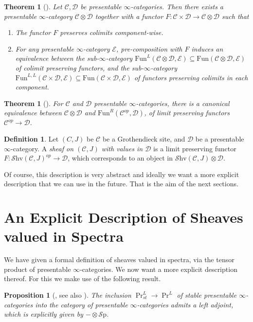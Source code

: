\documentclass[10pt]{amsart}
\newcommand{\C}{\mathscr{C}}
\newcommand{\D}{\mathscr{D}}
\newcommand{\E}{\mathscr{E}}
\newcommand{\Sp}{\mathscr{S}\mathrm{p}}
\newcommand{\Fun}{\mathrm{Fun}}
\newcommand{\Shv}{\mathscr{S}\mathrm{hv}}
\newtheorem{theorem}[equation]{Theorem}
\newtheorem{proposition}[equation]{Proposition}
\theoremstyle{definition}
\newtheorem{definition}[equation]{Definition}
\theoremstyle{remark}
\numberwithin{equation}{section}
\begin{document}
\begin{theorem}[{\cite[Proposition 4.8.1.15]{lurie2017ha}}]
  Let $\C, \D$ be presentable $\infty$-categories. Then there exists a presentable $\infty$-category $\C \otimes \D$ together with a functor $F:\C\times\D\rightarrow\C\otimes\D$ such that 
  \begin{enumerate}
	\item The functor $F$ preserves colimits component-wise.
	\item For any presentable $\infty$-category $\E$, pre-composition with $F$ induces an equivalence between the sub-$\infty$-category $\Fun^L(\C \otimes \D , \E)\subseteq\Fun(\C \otimes \D , \E)$ of colimit preserving functors, and the sub-$\infty$-category $\Fun^{L,L}(\C \times \D, \E)\subseteq\Fun(\C\times\D,\E)$ of functors preserving colimits in each component. 
  \end{enumerate}
\end{theorem}
\begin{theorem}[{\cite[Proposition 4.8.1.17]{lurie2017ha}}]For $\C$ and $\D$ presentable $\infty$-categories, there is a canonical equivalence between $\C\otimes\D$ and $\Fun^R(\C^{op},\D)$, of limit preserving functors $\C^{op}\to\D$. 
\end{theorem}
\begin{definition}
  Let $(C,J)$ be $\C$ be a Grothendieck site, and $\D$ be a presentable $\infty$-category. A \emph{sheaf on $(\C,J)$ with values in $\D$} is a limit preserving functor $F\colon \Shv(\C,J)^{op} \to \D$, which corresponds to an object in $\Shv(\C,J) \otimes \D$. 
\end{definition}

Of course, this description is very abstract and ideally we want a more explicit description that we can use in the future. That is the aim of the next sections.

\section{An Explicit Description of Sheaves valued in Spectra}

We have given a formal definition of sheaves valued in spectra, via the tensor product of presentable $\infty$-categories. We now want a more explicit description thereof. For this we make use of the following result.

\begin{proposition}[{\cite{lurie2017ha}, see also \cite{gepnergrothnikolaus2015infiniteloopspacemachine}}]
 The inclusion $\Pr^L_{st} \to \Pr^L$ of stable presentable $\infty$-categories into the category of presentable $\infty$-categories admits a left adjoint, which is explicitly given by $-\otimes\Sp$.
\end{proposition}
\end{document}
